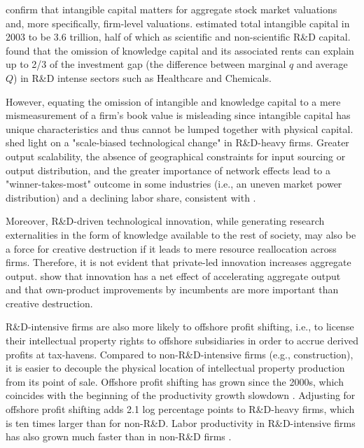\documentclass[12pt, letterpaper]{article}
\begin{document}
\cite{Hall2001-ni, McGrattan2001-kc, Vitorino2014-yd, Eisfeldt2020-ec, Li2014-zp} confirm that intangible capital matters for aggregate stock market valuations and, more specifically, firm-level valuations. \citep{Corrado2009-kd} estimated total intangible capital in 2003 to be 3.6 trillion, half of which as scientific and non-scientific R\&D capital. \citep{Crouzet2021-ic} found that the omission of knowledge capital and its associated rents can explain up to 2/3 of the investment gap (the difference between marginal $q$ and average $Q$) in R\&D intense sectors such as Healthcare and Chemicals.

However, equating the omission of intangible and knowledge capital to a mere mismeasurement of a firm's book value is misleading since intangible capital has unique characteristics and thus cannot be lumped together with physical capital. \citep{Autor2020-rw, Unger2019-ip} shed light on a "scale-biased technological change" in R\&D-heavy firms. Greater output scalability, the absence of geographical constraints for input sourcing or output distribution, and the greater importance of network effects lead to a "winner-takes-most" outcome in some industries (i.e., an uneven market power distribution) and a declining labor share, consistent with \citep{Barkai2020-gi}.

Moreover, R\&D-driven technological innovation, while generating research externalities in the form of knowledge available to the rest of society, may also be a force for creative destruction \citep{Schumpeter1939-er} if it leads to mere resource reallocation across firms. Therefore, it is not evident that private-led innovation increases aggregate output. \citep{Kogan2017-fx, Garcia-Macia2019-mg} show that innovation has a net effect of accelerating aggregate output and that own-product improvements by incumbents are more important than creative destruction.

R\&D-intensive firms are also more likely to offshore profit shifting, i.e., to license their intellectual property rights to offshore subsidiaries in order to accrue derived profits at tax-havens. Compared to non-R\&D-intensive firms (e.g., construction), it is easier to decouple the physical location of intellectual property production from its point of sale. Offshore profit shifting has grown since the 2000s, which coincides with the beginning of the productivity growth slowdown \citep{Fernald2015-io}. Adjusting for offshore profit shifting adds 2.1 log percentage points to R\&D-heavy firms, which is ten times larger than for non-R\&D. Labor productivity in R\&D-intensive firms has also grown much faster than in non-R\&D firms \citep{Guvenen2021-yh}.
\end{document}
